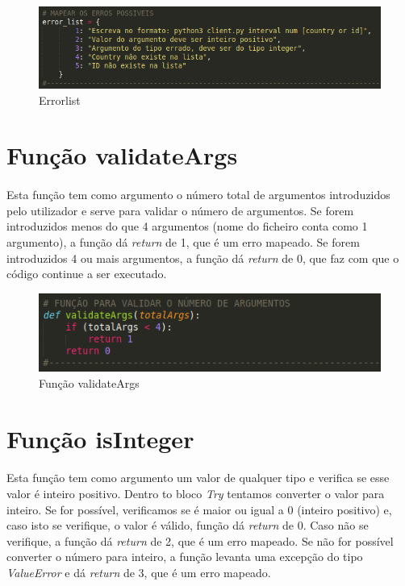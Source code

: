 \documentclass{report}
\begin{document}
\begin{figure}[H]
\centering
\includegraphics[width=1.1\linewidth]{error_list.png}
\caption{Error\textunderscore list}
\label{Error}
\end{figure}


\section{Função validateArgs }
\label{sec:validate}
\paragraph{}
Esta função tem como argumento o número total de argumentos introduzidos pelo utilizador e serve para validar o número de argumentos. \newline
Se forem introduzidos menos do que 4 argumentos (nome do ficheiro conta como 1 argumento), a função dá \textit{return} de 1, que é um erro mapeado. Se forem introduzidos 4 ou mais argumentos, a função dá \textit{return} de 0, que faz com que o código continue a ser executado.

\begin{figure}[H]
\centering
\includegraphics[width=1\linewidth]{validate_args.png}
\caption{Função validateArgs}
\label{valArgs}
\end{figure}


\section{Função isInteger }
\label{sec:isInteger}
\paragraph{}
Esta função tem como argumento um valor de qualquer tipo e verifica se esse valor é inteiro positivo. \newline 
Dentro to bloco \textit{Try} tentamos converter o valor para inteiro. Se for possível, verificamos se é maior ou igual a 0 (inteiro positivo) e, caso isto se verifique, o valor é válido, função dá \textit{return} de 0. Caso não se verifique, a função dá \textit{return} de 2, que é um erro mapeado. \newline
Se não for possível converter o número para inteiro, a função levanta uma excepção do tipo \textit{ValueError} e dá \textit{return} de 3, que é um erro mapeado.
\end{document}
